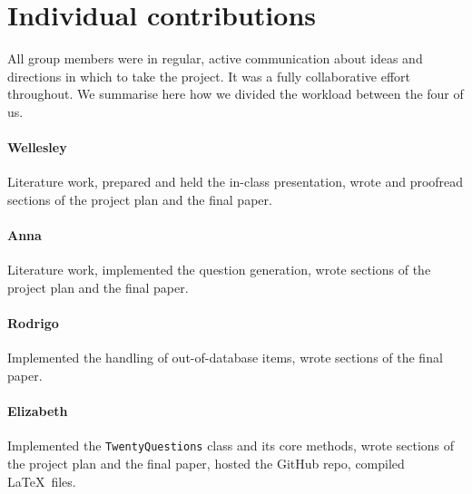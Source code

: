 \documentclass[11pt,a4paper]{article}
\begin{document}
\section{Individual contributions}
\label{app:contributions}

All group members were in regular, active communication about ideas and directions in which to take the project.
It was a fully collaborative effort throughout.
We summarise here how we divided the workload between the four of us.

\paragraph{Wellesley} Literature work, prepared and held the in-class presentation, wrote and proofread sections of the project plan and the final paper.

\paragraph{Anna} Literature work, implemented the question generation, wrote sections of the project plan and the final paper.

\paragraph{Rodrigo} Implemented the handling of out-of-database items, wrote sections of the final paper.

\paragraph{Elizabeth} Implemented the \texttt{TwentyQuestions} class and its core methods, wrote sections of the project plan and the final paper, hosted the GitHub repo, compiled \LaTeX\ files.
\end{document}
